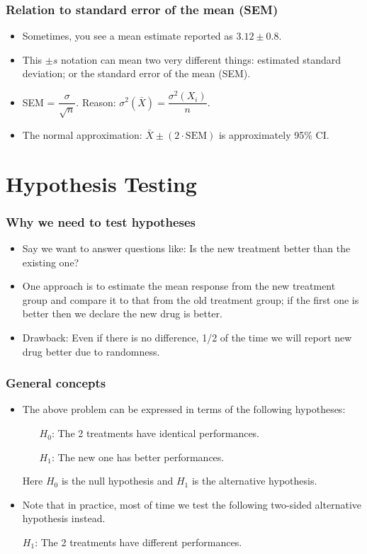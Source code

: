 \begin{frame}
  \frametitle{Relation to standard error of the mean (SEM)}
  \begin{itemize}
  \item Sometimes, you see a mean estimate reported as $3.12 \pm 0.8$.
  \item This $\pm s$ notation can mean two very different things:
    estimated standard deviation; or the standard error of the mean
    (SEM).
  \item SEM = $\dfrac{\sigma}{\sqrt{n}}$.  Reason:
    $\sigma^{2}(\bar{X}) = \dfrac{\sigma^{2}(X_{i})}{n}$.
  \item The normal approximation: $\bar{X} \pm (2 \cdot \mathrm{SEM})$
    is approximately 95\% CI.
  \end{itemize}
\end{frame}

\section{Hypothesis Testing}

\begin{frame}
  \frametitle{Why we need to test hypotheses}
  \begin{itemize}
  \item Say we want to answer questions like: Is the new treatment
    better than the existing one?
  \item One approach is to estimate the mean response from the new
    treatment group and compare it to that from the old treatment
    group; if the first one is better then we declare the new drug is
    better.
  \item Drawback: Even if there is \alert{no difference}, 1/2 of the
    time we will report new drug better due to \alert{randomness}.
  \end{itemize}
\end{frame}

\begin{frame}
  \frametitle{General concepts}
  \begin{itemize}
  \item The above problem can be expressed in terms of the following
    hypotheses:
    \begin{enumerate}
    \item [$H_{0}$:] The 2 treatments have identical performances.
    \item [$H_{1}$:] The new one has better performances.
    \end{enumerate}
    Here $H_{0}$ is the null hypothesis and $H_{1}$ is the alternative
    hypothesis.
  \item Note that in practice, most of time we test the following
    \alert{two-sided} alternative hypothesis instead.
  \item [$H_{1}$:] The 2 treatments have different performances.
  \end{itemize}
\end{frame}

